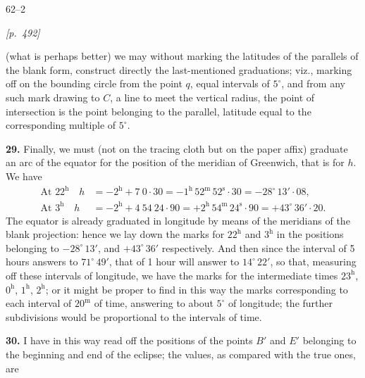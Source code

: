 \documentclass[11pt]{article}
\begin{document}
\medskip

\hfill 62--2

\medskip

\noindent\textit{[p.~492]}

\medskip

\noindent(what is perhaps better) we may without marking the latitudes
of the parallels of the blank form, construct directly the
last-mentioned graduations; viz., marking off on the bounding circle
from the point $q$, equal intervals of $5^{\circ}$, and from any such
mark drawing to $C$, a line to meet the vertical radius, the point of
intersection is the point belonging to the parallel, latitude equal to
the corresponding multiple of $5^{\circ}$.

\medskip

\textbf{29.} Finally, we must (not on the tracing cloth but on the paper
affix) graduate an arc of the equator for the position of the meridian
of Greenwich, that is for $h$. We have
\[
\begin{aligned}
\text{At }22^{\mathrm{h}}\quad h &= -2^{\mathrm{h}} + 7\ 0{\cdot}30 = -1^{\mathrm{h}}\,52^{\mathrm{m}}\,52^{\mathrm{s}}{\cdot}30 = -28^{\circ}\,13'{\cdot}08,\\
\text{At }3^{\mathrm{h}}\quad h &= -2^{\mathrm{h}} + 4\ 54\ 24{\cdot}90 = +2^{\mathrm{h}}\,54^{\mathrm{m}}\,24^{\mathrm{s}}{\cdot}90 = +43^{\circ}\,36'{\cdot}20.
\end{aligned}
\]
The equator is already graduated in longitude by means of the meridians
of the blank projection: hence we lay down the marks for $22^{\mathrm{h}}$
and $3^{\mathrm{h}}$ in the positions belonging to $-28^{\circ}\,13'$,
and $+43^{\circ}\,36'$ respectively. And then since the interval of 5
hours answers to $71^{\circ}\,49'$, that of 1 hour will answer to
$14^{\circ}\,22'$, so that, measuring off these intervals of longitude,
we have the marks for the intermediate times $23^{\mathrm{h}}$,
$0^{\mathrm{h}}$, $1^{\mathrm{h}}$, $2^{\mathrm{h}}$; or it might be
proper to find in this way the marks corresponding to each interval of
$20^{\mathrm{m}}$ of time, answering to about $5^{\circ}$ of longitude;
the further subdivisions would be proportional to the intervals of time.

\medskip

\textbf{30.} I have in this way read off the positions of the points
$B'$ and $E'$ belonging to the beginning and end of the eclipse; the
values, as compared with the true ones, are

\smallskip
\end{document}
